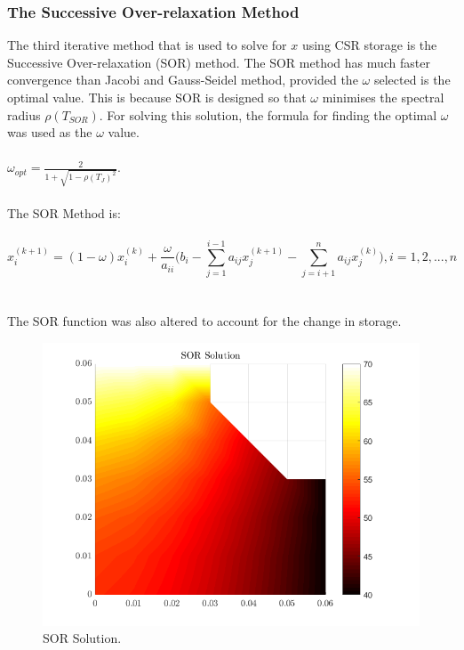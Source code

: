\documentclass[12pt,a4paper]{article}
\begin{document}
\subsubsection{The Successive Over-relaxation Method}
The third iterative method that is used to solve for $x$ using CSR storage is the Successive Over-relaxation (SOR) method. The SOR method has much faster convergence than Jacobi and Gauss-Seidel method, provided the $\omega$ selected is the optimal value. This is because SOR is designed so that $\omega$ minimises the spectral radius $\rho(T_{SOR})$. For solving this solution, the formula for finding the optimal $\omega$ was used as the $\omega$ value.
\\\\
$\omega_{opt} = \frac{2}{1+\sqrt{1-\rho(T_{J})^{2}}}$.
\\\\
The SOR Method is: 
\\\\
$$x_{i}^{(k+1)} = (1-\omega)x_{i}^{(k)}+\frac{\omega}{a_{ii}}\bigg(b_i-\sum_{j=1}^{i-1}a_{ij}x_{j}^{(k+1)}-\sum_{j=i+1}^{n}a_{ij}x_{j}^{(k)}\bigg), i = 1, 2, ..., n$$
\\\\
The SOR function was also altered to account for the change in storage.

\begin{figure}[H]
	\includegraphics[width=\linewidth]{images/sorsolution.png}
	\caption{SOR Solution.}
	\label{fig:sor}
\end{figure}
\end{document}
